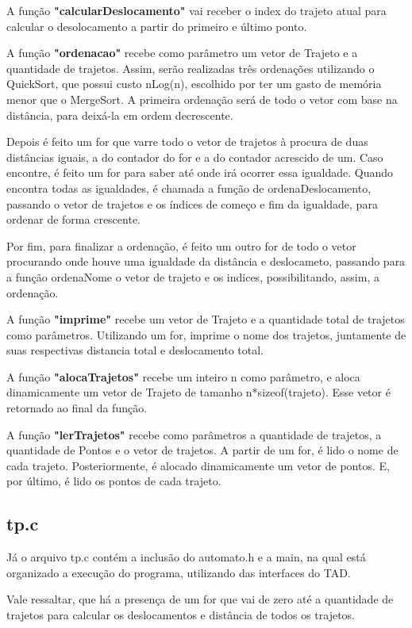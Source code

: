 \documentclass{article}
\begin{document}
    \par A função \textbf{"calcularDeslocamento"} vai receber o index do trajeto atual para calcular o desolocamento a partir do primeiro e último ponto.

     \par A função \textbf{"ordenacao"} recebe como parâmetro um vetor de Trajeto e a quantidade de trajetos. Assim, serão realizadas três ordenações utilizando o QuickSort, que possui custo nLog(n), escolhido por ter um gasto de memória menor que o MergeSort. A primeira ordenação será de todo o vetor com base na distância, para deixá-la em ordem decrescente.
     \par Depois é feito um for que varre todo o vetor de trajetos à procura de duas distâncias iguais, a do contador do for e a do contador acrescido de um. Caso encontre, é feito um for para saber até onde irá  ocorrer essa igualdade. Quando encontra todas as igualdades, é chamada a função de ordenaDeslocamento, passando o vetor de trajetos e os índices de começo e fim da igualdade, para ordenar de forma crescente. 
     \par Por fim, para finalizar a ordenação, é feito um outro for de todo o vetor procurando onde houve uma igualdade da distância e deslocameto, passando para a função ordenaNome o vetor de trajeto e os indices, possibilitando, assim, a ordenação.

     \par A função \textbf{"imprime"} recebe um vetor de Trajeto e a quantidade total de trajetos como parâmetros. Utilizando um for, imprime o nome dos trajetos, juntamente de suas respectivas distancia total e deslocamento total.

     \par A função \textbf{"alocaTrajetos"} recebe um inteiro n como parâmetro, e aloca dinamicamente um vetor de Trajeto de tamanho n*sizeof(trajeto). Esse vetor é retornado ao final da função.

     \par A função \textbf{"lerTrajetos"} recebe como parâmetros a quantidade de trajetos, a quantidade de Pontos e o vetor de trajetos. A partir de um for, é lido o nome de cada trajeto. Posteriormente, é alocado dinamicamente um vetor de pontos. E, por último, é lido os pontos de cada trajeto.
     

\subsection{tp.c}
    Já o arquivo tp.c contém a inclusão do automato.h e a main, na qual está organizado a execução do programa, utilizando das interfaces do TAD.
    \par Vale ressaltar, que há a presença de um for que vai de zero até a quantidade de trajetos para calcular os deslocamentos e distância de todos os trajetos.
\end{document}
